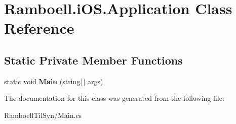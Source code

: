 \hypertarget{class_ramboell_1_1i_o_s_1_1_application}{}\section{Ramboell.\+i\+O\+S.\+Application Class Reference}
\label{class_ramboell_1_1i_o_s_1_1_application}
\subsection*{Static Private Member Functions}
\begin{DoxyCompactItemize}
\item 
\mbox{\label{class_ramboell_1_1i_o_s_1_1_application_a4be02ce99f53ab64c7a4c92e90e2d2b4}} 
static void {\bfseries Main} (string\mbox{[}$\,$\mbox{]} args)
\end{DoxyCompactItemize}


The documentation for this class was generated from the following file\+:\begin{DoxyCompactItemize}
\item 
Ramboell\+Til\+Syn/Main.\+cs\end{DoxyCompactItemize}
